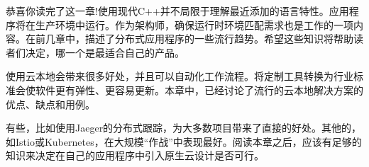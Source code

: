 恭喜你读完了这一章!使用现代C++并不局限于理解最近添加的语言特性。应用程序将在生产环境中运行。作为架构师，确保运行时环境匹配需求也是工作的一项内容。在前几章中，描述了分布式应用程序的一些流行趋势。希望这些知识将帮助读者们决定，哪一个是最适合自己的产品。

使用云本地会带来很多好处，并且可以自动化工作流程。将定制工具转换为行业标准会使软件更有弹性、更容易更新。本章中，已经讨论了流行的云本地解决方案的优点、缺点和用例。

有些，比如使用Jaeger的分布式跟踪，为大多数项目带来了直接的好处。其他的，如Istio或Kubernetes，在大规模“作战”中表现最好。阅读本章之后，应该有足够的知识来决定在自己的应用程序中引入原生云设计是否可行。